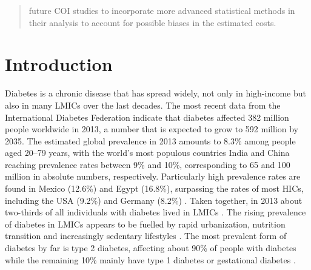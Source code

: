 \begin{abstract}
future \ac{COI} studies to incorporate more advanced statistical methods in their analysis to account for possible biases in the estimated costs.

\end{abstract}



\section{Introduction}
Diabetes is a chronic disease that has spread widely, not only in high-income but also in many \acp{LMIC} over the last decades. The most recent data from the International Diabetes Federation indicate that diabetes affected 382 million people worldwide in 2013, a number that is expected to grow to 592 million by 2035. The estimated global prevalence in 2013 amounts to 8.3\% among people aged 20--79 years, with the world's most populous countries India and China reaching prevalence rates between 9\DIFaddbegin \% \DIFaddend and 10\%, corresponding to 65 and 100 million in absolute numbers, respectively. Particularly high prevalence rates are found in Mexico (12.6\%) and Egypt (16.8\%), surpassing the rates of most \acp{HIC}, including the USA (9.2\%) and Germany (8.2\%) \parencite{InternationalDiabetesFederation2013}. Taken together, in 2013 about two-thirds of all individuals with diabetes lived in \acp{LMIC} \parencite{InternationalDiabetesFederation2013}. The rising prevalence of diabetes in \acp{LMIC} appears to be fuelled by rapid urbanization, nutrition transition and increasingly sedentary lifestyles \parencite{Hu2011}. The most prevalent form of diabetes by far is type 2 diabetes, affecting about 90\% of people with diabetes while the remaining 10\% mainly have type 1 diabetes or gestational diabetes \parencite{InternationalDiabetesFederation2013}.

